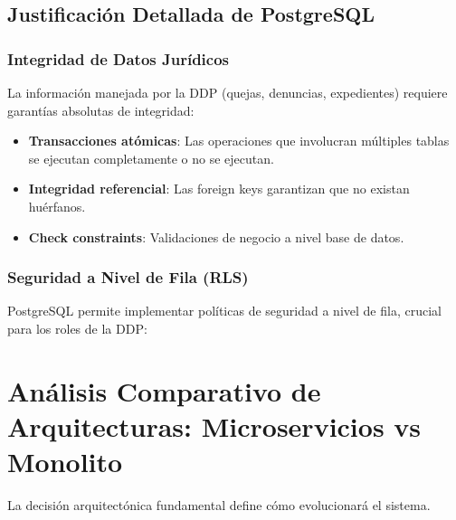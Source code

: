 \subsection{Justificación Detallada de PostgreSQL}

\subsubsection{Integridad de Datos Jurídicos}

La información manejada por la DDP (quejas, denuncias, expedientes) requiere garantías absolutas de integridad:

\begin{itemize}
    \item \textbf{Transacciones atómicas}: Las operaciones que involucran múltiples tablas se ejecutan completamente o no se ejecutan.
    \item \textbf{Integridad referencial}: Las foreign keys garantizan que no existan huérfanos.
    \item \textbf{Check constraints}: Validaciones de negocio a nivel base de datos.
\end{itemize}

\subsubsection{Seguridad a Nivel de Fila (RLS)}

PostgreSQL permite implementar políticas de seguridad a nivel de fila, crucial para los roles de la DDP:

\section{Análisis Comparativo de Arquitecturas: Microservicios vs Monolito}

La decisión arquitectónica fundamental define cómo evolucionará el sistema.

